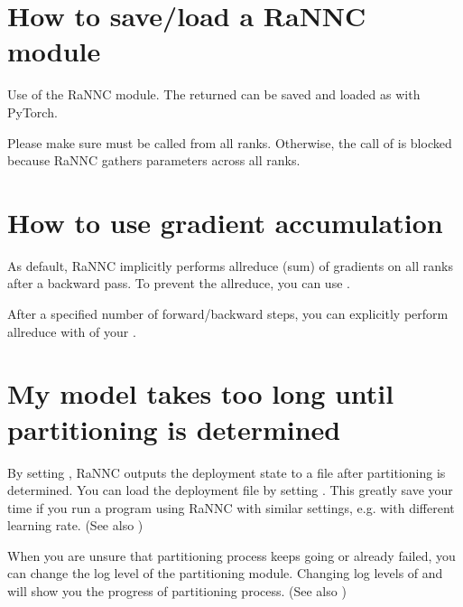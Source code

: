 \documentclass[letterpaper,10pt,english]{sphinxmanual}
\begin{document}
\section{How to save/load a RaNNC module}
\label{\detokenize{faq:how-to-save-load-a-rannc-module}}
Use  of the RaNNC module.
The returned  can be saved and loaded as with PyTorch.

Please make sure  must be called from all ranks.
Otherwise, the call of  is blocked because RaNNC gathers parameters across all ranks.


\section{How to use gradient accumulation}
\label{\detokenize{faq:how-to-use-gradient-accumulation}}
As default, RaNNC implicitly performs allreduce (sum) of gradients on all ranks after a backward pass.
To prevent the allreduce, you can use .

After a specified number of forward/backward steps, you can explicitly perform allreduce
with  of your .


\section{My model takes too long until partitioning is determined}
\label{\detokenize{faq:my-model-takes-too-long-until-partitioning-is-determined}}
By setting , RaNNC outputs the deployment state to a file  after
partitioning is determined. You can load the deployment file by setting .
This greatly save your time if you run a program using RaNNC with similar settings, e.g. with different learning rate.
(See also {\hyperref[\detokenize{config::doc}]{}})

When you are unsure that partitioning process keeps going or already failed, you can change the log level of
the partitioning module. Changing log levels of  and  will show you the progress of
partitioning process.
(See also {\hyperref[\detokenize{logging::doc}]{}})
\end{document}
